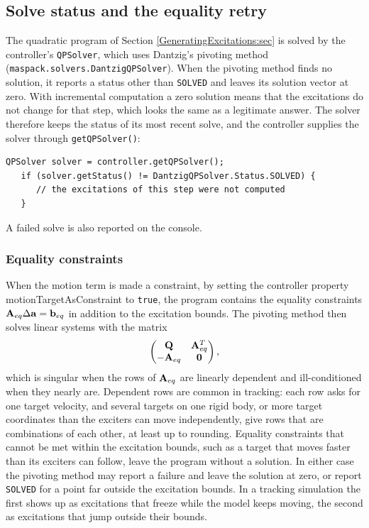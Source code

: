 \subsection{Solve status and the equality retry}
\label{SolveStatus:sec}

The quadratic program of Section \ref{GeneratingExcitations:sec} is solved
by the controller's {\tt QPSolver}, which uses Dantzig's pivoting method
({\tt maspack.solvers.DantzigQPSolver}). When the pivoting method finds no
solution, it reports a status other than {\tt SOLVED} and leaves its
solution vector at zero. With incremental computation a zero solution means
that the excitations do not change for that step, which looks the same as a
legitimate answer. The solver therefore keeps the status of its most recent
solve, and the controller supplies the solver through {\tt getQPSolver()}:
%
\begin{lstlisting}[]
   QPSolver solver = controller.getQPSolver();
   if (solver.getStatus() != DantzigQPSolver.Status.SOLVED) {
      // the excitations of this step were not computed
   }
\end{lstlisting}
%
A failed solve is also reported on the console.

\subsubsection{Equality constraints}

When the motion term is made a constraint, by setting the controller
property {\sf motionTargetAsConstraint} to {\tt true}, the program contains
the equality constraints ${\bf A}_{eq} \Delta {\bf a} = {\bf b}_{eq}$ in addition to the
excitation bounds. The pivoting method then solves linear systems with the
matrix
%
\begin{equation*}
\left(\begin{matrix}
{\bf Q} & {\bf A}_{eq}^T \\
-{\bf A}_{eq} & {\bf 0}
\end{matrix}\right),
\end{equation*}
%
which is singular when the rows of ${\bf A}_{eq}$ are linearly dependent and
ill-conditioned when they nearly are. Dependent rows are common in
tracking: each row asks for one target velocity, and several targets on one
rigid body, or more target coordinates than the exciters can move
independently, give rows that are combinations of each other, at least up
to rounding. Equality constraints that cannot be met within the excitation
bounds, such as a target that moves faster than its exciters can follow,
leave the program without a solution. In either case the pivoting method
may report a failure and leave the solution at zero, or report {\tt SOLVED}
for a point far outside the excitation bounds. In a tracking simulation the
first shows up as excitations that freeze while the model keeps moving, the
second as excitations that jump outside their bounds.

